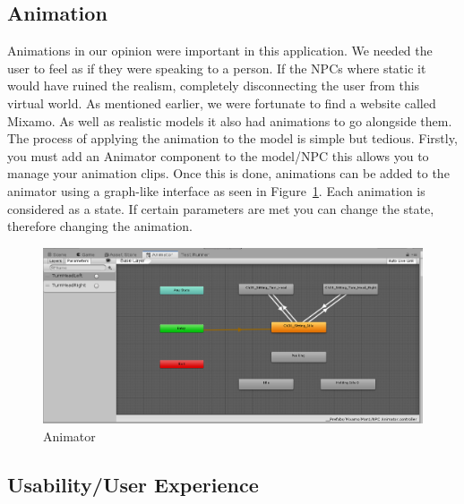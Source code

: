 \subsection{Animation}
Animations in our opinion were important in this application. We needed the user to feel as if they were speaking to a person. If the NPCs where static it would have ruined the realism, completely disconnecting the user from this virtual world. As mentioned earlier, we were fortunate to find a website called Mixamo. As well as realistic models it also had animations to go alongside them. The process of applying the animation to the model is simple but tedious. Firstly, you must add an Animator component to the model/NPC this allows you to manage your animation clips. Once this is done, animations can be added to the animator using a graph-like interface as seen in Figure~\ref{fig:anim}. Each animation is considered as a state. If certain parameters are met you can change the state, therefore changing the animation.

\begin{figure}[!ht]
    \centering
    \includegraphics[width=1\textwidth]{Images/animator.PNG}
    \caption{Animator}
    \label{fig:anim}
\end{figure}

\subsection{Usability/User Experience}

